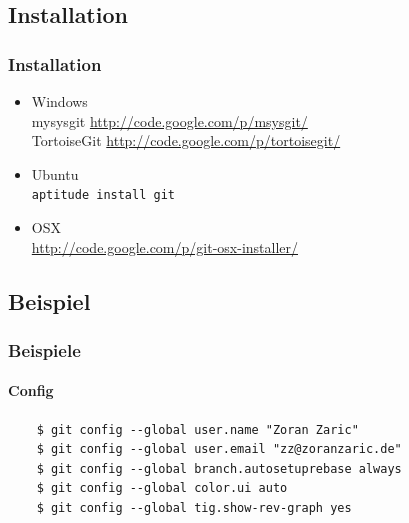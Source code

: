 \documentclass[]{beamer}
\begin{document}
\subsection{Installation}
\begin{frame}[fragile]
	\frametitle{Installation}
	\begin{itemize}
		\item
			Windows\\
			mysysgit \url{http://code.google.com/p/msysgit/}\\
			TortoiseGit \url{http://code.google.com/p/tortoisegit/}
		\item
			Ubuntu\\
			\verb|aptitude install git|
		\item
			OSX\\
			\url{http://code.google.com/p/git-osx-installer/}
	\end{itemize}
\end{frame}

\subsection{Beispiel}
\begin{frame}[fragile]
	\frametitle{Beispiele}
	\framesubtitle{Config}
	\begin{verbatim}
	$ git config --global user.name "Zoran Zaric"
	$ git config --global user.email "zz@zoranzaric.de"
	$ git config --global branch.autosetuprebase always
	$ git config --global color.ui auto
	$ git config --global tig.show-rev-graph yes
	\end{verbatim}
\end{frame}
\end{document}
